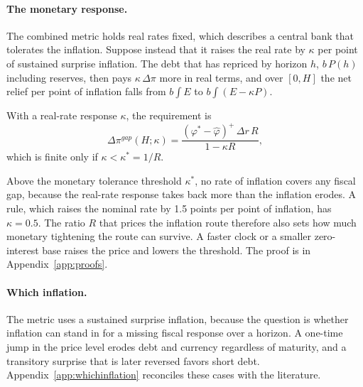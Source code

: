 \paragraph{The monetary response.} The combined metric holds real rates fixed, which describes a central bank that tolerates the inflation. Suppose instead that it raises the real rate by $\kappa$ per point of sustained surprise inflation. The debt that has repriced by horizon $h$, $b\,P(h)$ including reserves, then pays $\kappa\,\Delta\pi$ more in real terms, and over $[0,H]$ the net relief per point of inflation falls from $b\int E$ to $b\int(E-\kappa P)$.

\begin{proposition}\label{prop:kappa}
With a real-rate response $\kappa$, the requirement is
\begin{equation}\label{eq:kappa}
\Delta\pi^{gap}(H;\kappa)=\frac{(\varphi^*-\hat\varphi)^+\,\Delta r\,R}{1-\kappa R},
\end{equation}
which is finite only if $\kappa<\kappa^*=1/R$.
\end{proposition}

Above the monetary tolerance threshold $\kappa^*$, no rate of inflation covers any fiscal gap, because the real-rate response takes back more than the inflation erodes. A \citet{taylor1993} rule, which raises the nominal rate by 1.5 points per point of inflation, has $\kappa=0.5$. The ratio $R$ that prices the inflation route therefore also sets how much monetary tightening the route can survive. A faster clock or a smaller zero-interest base raises the price and lowers the threshold. The proof is in Appendix~\ref{app:proofs}.

\paragraph{Which inflation.} The metric uses a sustained surprise inflation, because the question is whether inflation can stand in for a missing fiscal response over a horizon. A one-time jump in the price level erodes debt and currency regardless of maturity, and a transitory surprise that is later reversed favors short debt. Appendix~\ref{app:whichinflation} reconciles these cases with the literature.
